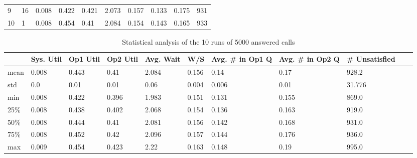 \documentclass{article}
\begin{document}
\begin{table}[H]
\begin{tabular}{@{}llllllllll@{}}
        9            & 16            & 0.008              & 0.422             & 0.421             & 2.073              & 0.157        & 0.133                     & 0.175                     & 931                     \\
        10           & 1             & 0.008              & 0.454             & 0.41              & 2.084              & 0.154        & 0.143                     & 0.165                     & 933                     \\ \bottomrule
    \end{tabular}
\end{table}

\begin{table}[H]
    \tiny
    \centering
    \caption{Statistical analysis of the 10 runs of 5000 answered calls}
    \begin{tabular}{@{}lllllllllll@{}}
        \toprule
        \textbf{} & \textbf{Sys. Util} & \textbf{Op1 Util} & \textbf{Op2 Util} & \textbf{Avg. Wait} & \textbf{W/S} & \textbf{Avg. \# in Op1 Q} & \textbf{Avg. \# in Op2 Q} & \textbf{\# Unsatisfied} \\ \midrule
        mean      & 0.008              & 0.443             & 0.41              & 2.084              & 0.156        & 0.14                      & 0.17                      & 928.2                   \\
        std       & 0.0                & 0.01              & 0.01              & 0.06               & 0.004        & 0.006                     & 0.01                      & 31.776                  \\
        min       & 0.008              & 0.422             & 0.396             & 1.983              & 0.151        & 0.131                     & 0.155                     & 869.0                   \\
        25\%      & 0.008              & 0.438             & 0.402             & 2.068              & 0.154        & 0.136                     & 0.163                     & 919.0                   \\
        50\%      & 0.008              & 0.444             & 0.41              & 2.081              & 0.156        & 0.142                     & 0.168                     & 931.0                   \\
        75\%      & 0.008              & 0.452             & 0.42              & 2.096              & 0.157        & 0.144                     & 0.176                     & 936.0                   \\
        max       & 0.009              & 0.454             & 0.423             & 2.22               & 0.163        & 0.148                     & 0.19                      & 995.0                   \\ \bottomrule
    \end{tabular}
\end{table}
\end{document}
